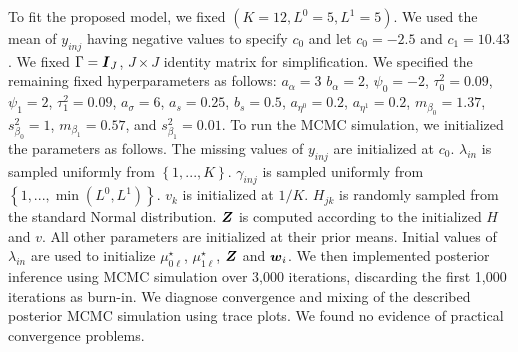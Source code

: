 \documentclass[12pt,]{article}
\newcommand{\bc}[1]{ \left\{#1\right\} }
\newcommand{\bZ}{\mbox{\boldmath $Z$}}
\newcommand{\bw}{\mbox{\boldmath $w$}}
\newcommand{\bI}{\mbox{\boldmath $I$}}
\begin{document}
To fit the proposed model, we fixed $(K=12, L^0=5,
L^1=5)$. We used the mean of $y_{inj}$  having negative values to specify $c_0$
and let $c_0=-2.5$ and $c_1=10.43$. We fixed $\Gamma=\bI_J$,
$J\times J$ identity matrix for simplification. We specified the remaining fixed
hyperparameters as follows:
%
$a_\alpha=3$ $b_\alpha=2$, $\psi_0=-2$, $\tau^2_0=0.09$, $\psi_1=2$,
$\tau^2_1=0.09$, $a_\sigma=6$, $a_s=0.25$, $b_s=0.5$, $a_{\eta^0}=0.2$,
$a_{\eta^1}=0.2$, $m_{\beta_0}=1.37$, $s^2_{\beta_0}=1$,
$m_{\beta_1}=0.57$, and $s^2_{\beta_1}=0.01$.
%
To run the MCMC simulation, we
initialized the parameters as follows. The missing values of $y_{inj}$ are
initialized at $c_0$.  $\lambda_{in}$ is sampled uniformly from $\bc{1,...,K}$.
$\gamma_{inj}$ is sampled uniformly from $\bc{1,...,\min(L^0,L^1)}$. $v_k$ is
initialized at $1/K$. $H_{jk}$ is randomly sampled from the standard Normal
distribution.  $\bZ$ is computed according to the initialized $H$ and $v$. All
other parameters are initialized at their prior means.  Initial values of
$\lambda_{in}$ are used to initialize $\mu^{\star}_{0\ell}$,
$\mu^{\star}_{1\ell}$, $\bZ$ and $\bw_i$.  We then implemented posterior
inference using MCMC simulation over 3,000 iterations, discarding the first
1,000 iterations as burn-in.  We diagnose convergence and mixing of the
described posterior MCMC simulation using trace plots. We found no evidence of
practical convergence problems. 
\end{document}
